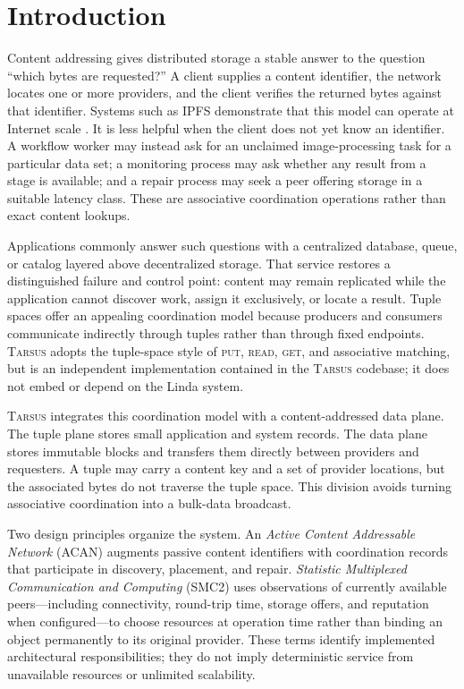 \documentclass[conference]{IEEEtran}
\newcommand{\system}{\textsc{Tarsus}\xspace}
\newcommand{\putop}{\textsc{put}\xspace}
\newcommand{\readop}{\textsc{read}\xspace}
\newcommand{\getop}{\textsc{get}\xspace}
\begin{document}
\section{Introduction}

Content addressing gives distributed storage a stable answer to the question
``which bytes are requested?'' A client supplies a content identifier, the
network locates one or more providers, and the client verifies the returned
bytes against that identifier. Systems such as IPFS demonstrate that this model
can operate at Internet scale \cite{Trautwein2022}. It is less helpful when the
client does not yet know an identifier. A workflow worker may instead ask for
an unclaimed image-processing task for a particular data set; a monitoring
process may ask whether any result from a stage is available; and a repair
process may seek a peer offering storage in a suitable latency class. These are
associative coordination operations rather than exact content lookups.

Applications commonly answer such questions with a centralized database,
queue, or catalog layered above decentralized storage. That service restores a
distinguished failure and control point: content may remain replicated while
the application cannot discover work, assign it exclusively, or locate a
result. Tuple spaces offer an appealing coordination model because producers
and consumers communicate indirectly through tuples rather than through fixed
endpoints. \system adopts the tuple-space style of \putop, \readop, \getop, and
associative matching, but is an independent implementation contained in the
\system codebase; it does not embed or depend on the Linda system.

\system integrates this coordination model with a content-addressed data plane.
The tuple plane stores small application and system records. The data plane
stores immutable blocks and transfers them directly between providers and
requesters. A tuple may carry a content key and a set of provider locations,
but the associated bytes do not traverse the tuple space. This division avoids
turning associative coordination into a bulk-data broadcast.

Two design principles organize the system. An \emph{Active Content Addressable
Network} (ACAN) augments passive content identifiers with coordination records
that participate in discovery, placement, and repair. \emph{Statistic
Multiplexed Communication and Computing} (SMC2) uses observations of currently
available peers---including connectivity, round-trip time, storage offers, and
reputation when configured---to choose resources at operation time rather than
binding an object permanently to its original provider. These terms identify
implemented architectural responsibilities; they do not imply deterministic
service from unavailable resources or unlimited scalability.
\end{document}
